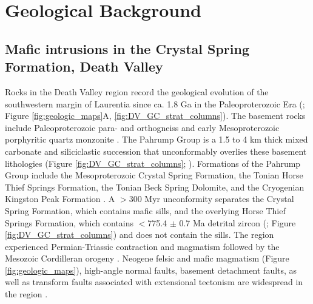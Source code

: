 \section{Geological Background}
\subsection{Mafic intrusions in the Crystal Spring Formation, Death Valley}

Rocks in the Death Valley region record the geological evolution of the southwestern margin of Laurentia since ca. 1.8 Ga in the Paleoproterozoic Era (\citealp{Tapani-Ramo1998a}; Figure \ref{fig:geologic_maps}A, \ref{fig:DV_GC_strat_columns}). The basement rocks include Paleoproterozoic para- and orthogneiss \citep{Wasserburg1959a, Barth2000a, Strickland2013a} and early Mesoproterozoic porphyritic quartz monzonite \citep{Labotka1980a}. The Pahrump Group is a 1.5 to 4 km thick mixed carbonate and siliciclastic succession that unconformably overlies these basement lithologies (Figure \ref{fig:DV_GC_strat_columns}; \citealp{Wright1974a, Macdonald2013a}). Formations of the Pahrump Group include the Mesoproterozoic Crystal Spring Formation, the Tonian Horse Thief Springs Formation, the Tonian Beck Spring Dolomite, and the Cryogenian Kingston Peak Formation \citep{Macdonald2013a, Mahon2014a}. A $>$300 Myr unconformity separates the Crystal Spring Formation, which contains mafic sills, and the overlying Horse Thief Springs Formation, which contains $<$775.4 $\pm$ 0.7 Ma detrital zircon (\citealp{Mahon2014a, Dehler2023a}; Figure \ref{fig:DV_GC_strat_columns}) and does not contain the sills. The region experienced Permian-Triassic contraction and magmatism \citep{Snow1991a, Stevens1997a} followed by the Mesozoic Cordilleran orogeny \citep{Burchfiel1992a, Burchfiel1970a, Snow1991a}. Neogene felsic and mafic magmatism (Figure \ref{fig:geologic_maps}), high-angle normal faults, basement detachment faults, as well as transform faults associated with extensional tectonism are widespread in the region \citep{Wright1974a, Snow2000a, Calzia2000a, Wrucke2007a, Renik2013a}. 

